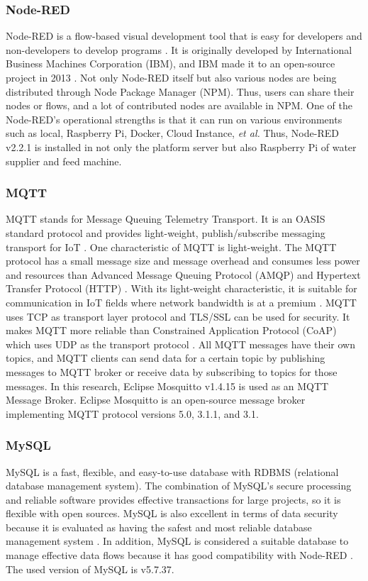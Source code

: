 \documentclass[conference]{IEEEtran}
\begin{document}
\subsubsection{Node-RED}
Node-RED is a flow-based visual development tool that is easy for developers and non-developers to develop programs \cite{b17}.
It is originally developed by International Business Machines Corporation (IBM), and IBM made it to an open-source project in 2013 \cite{b8}. Not only Node-RED itself but also various nodes are being distributed through Node Package Manager (NPM). Thus, users can share their nodes or flows, and a lot of contributed nodes are available in NPM.
One of the Node-RED’s operational strengths is that it can run on various environments such as local, Raspberry Pi, Docker, Cloud Instance, \textit{et al.} Thus, Node-RED v2.2.1 is installed in not only the platform server but also Raspberry Pi of water supplier and feed machine.

\subsubsection{MQTT}
MQTT stands for Message Queuing Telemetry Transport. It is an OASIS standard protocol and provides light-weight, publish/subscribe messaging transport for IoT \cite{b9}.
One characteristic of MQTT is light-weight. The MQTT protocol has a small message size and message overhead and consumes less power and resources than Advanced Message Queuing Protocol (AMQP) and Hypertext Transfer Protocol (HTTP) \cite{b18}. With its light-weight characteristic, it is suitable for communication in IoT fields where network bandwidth is at a premium \cite{b19}.
MQTT uses TCP as transport layer protocol and TLS/SSL can be used for security. It makes MQTT more reliable than Constrained Application Protocol (CoAP) which uses UDP as the transport protocol \cite{b18}.
All MQTT messages have their own topics, and MQTT clients can send data for a certain topic by publishing messages to MQTT broker or receive data by subscribing to topics for those messages.
In this research, Eclipse Mosquitto v1.4.15 is used as an MQTT Message Broker. Eclipse Mosquitto is an open-source message broker implementing MQTT protocol versions 5.0, 3.1.1, and 3.1\cite{b20}. 

\subsubsection{MySQL}
MySQL is a fast, flexible, and easy-to-use database with RDBMS (relational database management system). The combination of MySQL’s secure processing and reliable software provides effective transactions for large projects, so it is flexible with open sources. MySQL is also excellent in terms of data security because it is evaluated as having the safest and most reliable database management system \cite{b21}. In addition, MySQL is considered a suitable database to manage effective data flows because it has good compatibility with Node-RED \cite{b21}. The used version of MySQL is v5.7.37.
\end{document}
